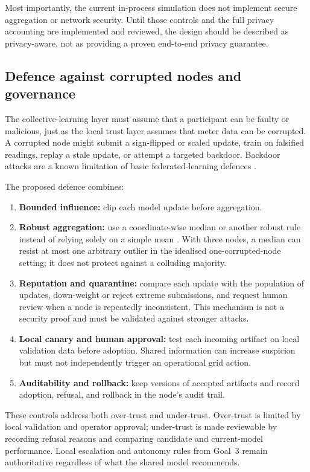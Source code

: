 Most importantly, the current in-process simulation does not implement secure aggregation or network security. Until those controls and the full privacy accounting are implemented and reviewed, the design should be described as privacy-aware, not as providing a proven end-to-end privacy guarantee.

\subsection{Defence against corrupted nodes and governance}
The collective-learning layer must assume that a participant can be faulty or malicious, just as the local trust layer assumes that meter data can be corrupted. A corrupted node might submit a sign-flipped or scaled update, train on falsified readings, replay a stale update, or attempt a targeted backdoor. Backdoor attacks are a known limitation of basic federated-learning defences \cite{bagdasaryan2020}.

The proposed defence combines:
\begin{enumerate}
  \item \textbf{Bounded influence:} clip each model update before aggregation.
  \item \textbf{Robust aggregation:} use a coordinate-wise median or another robust rule instead of relying solely on a simple mean \cite{yin2018}. With three nodes, a median can resist at most one arbitrary outlier in the idealised one-corrupted-node setting; it does not protect against a colluding majority.
  \item \textbf{Reputation and quarantine:} compare each update with the population of updates, down-weight or reject extreme submissions, and request human review when a node is repeatedly inconsistent. This mechanism is not a security proof and must be validated against stronger attacks.
  \item \textbf{Local canary and human approval:} test each incoming artifact on local validation data before adoption. Shared information can increase suspicion but must not independently trigger an operational grid action.
  \item \textbf{Auditability and rollback:} keep versions of accepted artifacts and record adoption, refusal, and rollback in the node's audit trail.
\end{enumerate}

These controls address both over-trust and under-trust. Over-trust is limited by local validation and operator approval; under-trust is made reviewable by recording refusal reasons and comparing candidate and current-model performance. Local escalation and autonomy rules from Goal~3 remain authoritative regardless of what the shared model recommends.

